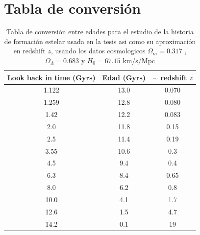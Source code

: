 \chapter{Tabla de conversión}

\begin{table}[!ht]
\centering
\begin{tabular}{||c | c | c||}
\hline
\hline
Look back in time (Gyrs) & Edad (Gyrs) & $\sim$ redshift $z$ \\
\hline
\hline


1.122  & 13.0  & 0.070  \\
1.259 & 12.8 & 0.080   \\
1.42  & 12.2 & 0.083  \\
2.0  & 11.8 & 0.15  \\
2.5 & 11.4 & 0.19  \\
3.55  & 10.6 & 0.3  \\
4.5  & 9.4 & 0.4  \\
6.3 & 8.4 & 0.65  \\
8.0   &  6.2 & 0.8  \\
10.0  & 4.1  & 1.7  \\
12.6  & 1.5  & 4.7  \\
14.2  & 0.1  & 19  \\

\hline
\hline
\end{tabular}
\caption{Tabla de conversión entre edades para el estudio de la historia de formación estelar usada en la tesis asi como su aproximación en redshift $z$, usando los datos cosmologicos $\Omega_m = 0.317$ , $\Omega_{\Lambda}=0.683$ y $H_0 = 67.15$ km/s/Mpc \citep{plank2014}} 
\label{tab_conversion}                              %
\end{table}
